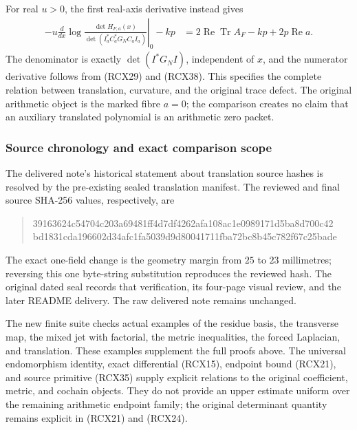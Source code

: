 For real \(u>0\), the first real-axis derivative instead gives
\[
\begin{split}
 -u\left.\frac d{dx}
   \log\frac{\det H_{F,a}(x)}
                 {\det(I_a^*C_a^*G_NC_aI_a)}\right|_0-kp
   &=2\operatorname{Re}\operatorname{Tr}A_F-kp
       +2p\operatorname{Re}a .
\end{split}\tag{RCX39}
\]
The denominator is exactly \(\det(I^*G_NI)\), independent of
\(x\), and the numerator derivative follows from (RCX29) and
(RCX38). This specifies the complete relation between translation,
curvature, and the original trace defect. The original arithmetic
object is the marked fibre \(a=0\); the comparison creates no claim
that an auxiliary translated polynomial is an arithmetic zero packet.

\subsubsection{Source chronology and exact comparison scope}

The delivered note's historical statement about translation source
hashes is resolved by the pre-existing sealed translation manifest.
The reviewed and final source SHA-256 values, respectively, are
\begin{quote}\small\ttfamily
\noindent
39163624c54704c203a69481ff4d7df4262afa108ac1e0989171d5ba8d700c42\\
bd1831cda196602d34afc1fa5039d9d80041711fba72bc8b45c782f67c25bade
\end{quote}
The exact one-field change is the geometry margin from \(25\) to
\(23\) millimetres; reversing this one byte-string substitution
reproduces the reviewed hash. The original dated seal records
that verification, its four-page visual review, and the later
README delivery. The raw delivered note remains unchanged.

The new finite suite checks actual examples of the residue basis,
the transverse map, the mixed jet with factorial, the metric
inequalities, the forced Laplacian, and translation. These examples
supplement the full proofs above. The universal endomorphism
identity, exact differential (RCX15), endpoint bound (RCX21), and
source primitive (RCX35) supply explicit relations to the original
coefficient, metric, and cochain objects. They do not provide an
upper estimate uniform over the remaining arithmetic endpoint
family; the original determinant quantity remains explicit in
(RCX21) and (RCX24).

